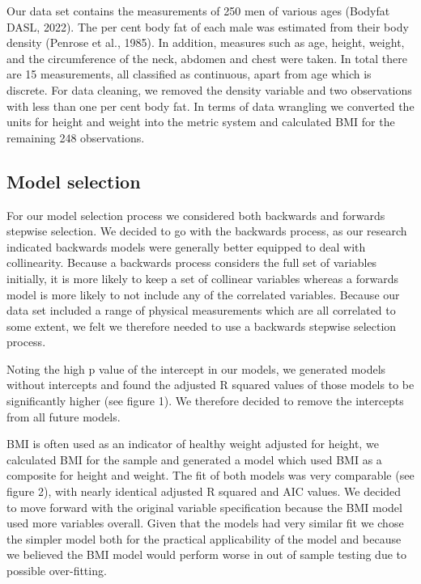 \documentclass[letterpaper,9pt,twocolumn,twoside,]{pinp}
\begin{document}
Our data set contains the measurements of 250 men of various ages
(Bodyfat DASL, 2022). The per cent body fat of each male was estimated
from their body density (Penrose et al., 1985). In addition, measures
such as age, height, weight, and the circumference of the neck, abdomen
and chest were taken. In total there are 15 measurements, all classified
as continuous, apart from age which is discrete. For data cleaning, we
removed the density variable and two observations with less than one per
cent body fat. In terms of data wrangling we converted the units for
height and weight into the metric system and calculated BMI for the
remaining 248 observations.

\hypertarget{model-selection}{%
\subsection{Model selection}\label{model-selection}}

For our model selection process we considered both backwards and
forwards stepwise selection. We decided to go with the backwards
process, as our research indicated backwards models were generally
better equipped to deal with collinearity. Because a backwards process
considers the full set of variables initially, it is more likely to keep
a set of collinear variables whereas a forwards model is more likely to
not include any of the correlated variables. Because our data set
included a range of physical measurements which are all correlated to
some extent, we felt we therefore needed to use a backwards stepwise
selection process.

Noting the high p value of the intercept in our models, we generated
models without intercepts and found the adjusted R squared values of
those models to be significantly higher (see figure 1). We therefore
decided to remove the intercepts from all future models.

BMI is often used as an indicator of healthy weight adjusted for height,
we calculated BMI for the sample and generated a model which used BMI as
a composite for height and weight. The fit of both models was very
comparable (see figure 2), with nearly identical adjusted R squared and
AIC values. We decided to move forward with the original variable
specification because the BMI model used more variables overall. Given
that the models had very similar fit we chose the simpler model both for
the practical applicability of the model and because we believed the BMI
model would perform worse in out of sample testing due to possible
over-fitting.
\end{document}
